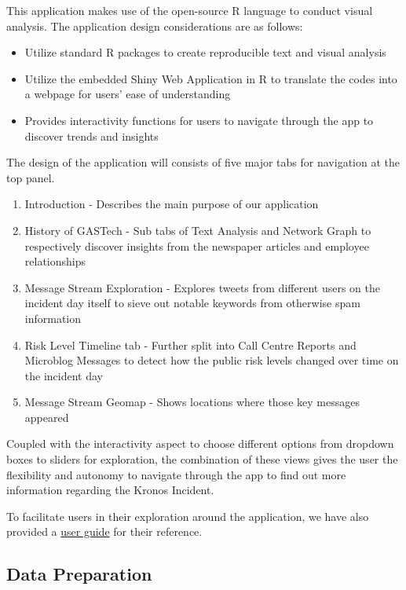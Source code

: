\documentclass{acm_proc_article-sp}
\providecommand{\tightlist}{%
  \setlength{\itemsep}{0pt}\setlength{\parskip}{0pt}}
\begin{document}
This application makes use of the open-source R language to conduct
visual analysis. The application design considerations are as follows:

\begin{itemize}
\item
  Utilize standard R packages to create reproducible text and visual
  analysis
\item
  Utilize the embedded Shiny Web Application in R to translate the codes
  into a webpage for users' ease of understanding
\item
  Provides interactivity functions for users to navigate through the app
  to discover trends and insights
\end{itemize}

The design of the application will consists of five major tabs for
navigation at the top panel.

\begin{enumerate}
\def\labelenumi{\roman{enumi})}
\tightlist
\item
  Introduction - Describes the main purpose of our application
\item
  History of GASTech - Sub tabs of Text Analysis and Network Graph to
  respectively discover insights from the newspaper articles and
  employee relationships
\item
  Message Stream Exploration - Explores tweets from different users on
  the incident day itself to sieve out notable keywords from otherwise
  spam information
\item
  Risk Level Timeline tab - Further split into Call Centre Reports and
  Microblog Messages to detect how the public risk levels changed over
  time on the incident day
\item
  Message Stream Geomap - Shows locations where those key messages
  appeared
\end{enumerate}

Coupled with the interactivity aspect to choose different options from
dropdown boxes to sliders for exploration, the combination of these
views gives the user the flexibility and autonomy to navigate through
the app to find out more information regarding the Kronos Incident.

To facilitate users in their exploration around the application, we have
also provided a
\href{https://grp15-vast-project.netlify.app/userguide}{user guide} for
their reference.

\hypertarget{data-preparation}{%
\subsection{Data Preparation}\label{data-preparation}}
\end{document}
